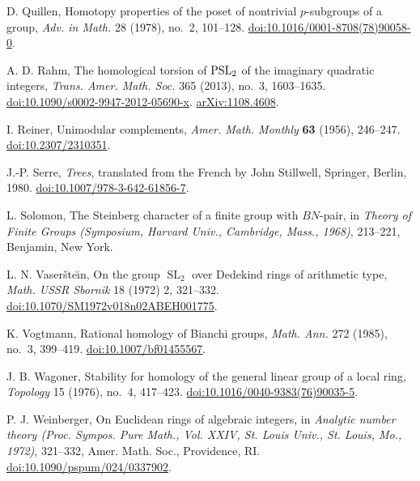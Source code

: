 \documentclass[11 pt]{article}
\theoremstyle{plain}
\theoremstyle{definition}
\numberwithin{equation}{section}
\DeclareMathOperator{\SL}{SL}
\newcommand{\arXiv}[1]{\href{http://arxiv.org/abs/#1}{arXiv:#1}}
\newcommand{\doi}[1]{\href{http://dx.doi.org/#1}{doi:#1}}
\begin{document}
\begin{thebibliography}{vdKL}
\begin{footnotesize}
D. Quillen, Homotopy properties of the poset of nontrivial $p$-subgroups of a group, \emph{Adv. in Math.} 28 (1978), no.~2, 101--128. \doi{10.1016/0001-8708(78)90058-0}.

A. D. Rahm, The homological torsion of $\rm{PSL}\sb 2$ of the imaginary quadratic integers, \emph{Trans. Amer. Math. Soc.} 365 (2013), no.~3, 1603--1635. \doi{10.1090/s0002-9947-2012-05690-x}. \arXiv{1108.4608}.

I. Reiner, Unimodular complements, \emph{Amer. Math. Monthly} \textbf{63} (1956), 246--247. \doi{10.2307/2310351}.

J.-P. Serre, \textit{Trees}, translated from the French by John Stillwell, Springer, Berlin, 1980. \doi{10.1007/978-3-642-61856-7}.

L. Solomon, The Steinberg character of a finite group with $BN$-pair, in {\it Theory of Finite Groups (Symposium, Harvard Univ., Cambridge, Mass., 1968)}, 213--221, Benjamin, New York. 

L. N. Vaser\v ste\u\i n, On the group $\SL_2$ over Dedekind rings of arithmetic type, \emph{Math. USSR Sbornik} 18 (1972) 2, 321--332. \doi{10.1070/SM1972v018n02ABEH001775}.

K. Vogtmann, Rational homology of Bianchi groups, \emph{Math. Ann.} 272 (1985), no.~3, 399--419. \doi{10.1007/bf01455567}.

J. B. Wagoner, Stability for homology of the general linear group of a local ring, \emph{Topology} 15  (1976),  no.~4, 417--423. \doi{10.1016/0040-9383(76)90035-5}.

P. J. Weinberger, On Euclidean rings of algebraic integers, in \textit{Analytic number theory (Proc. Sympos. Pure Math., Vol. XXIV, St. Louis Univ., St. Louis, Mo., 1972)}, 321--332, Amer. Math. Soc., Providence, RI. \doi{10.1090/pspum/024/0337902}.

\end{footnotesize}
\end{thebibliography}
\end{document}

